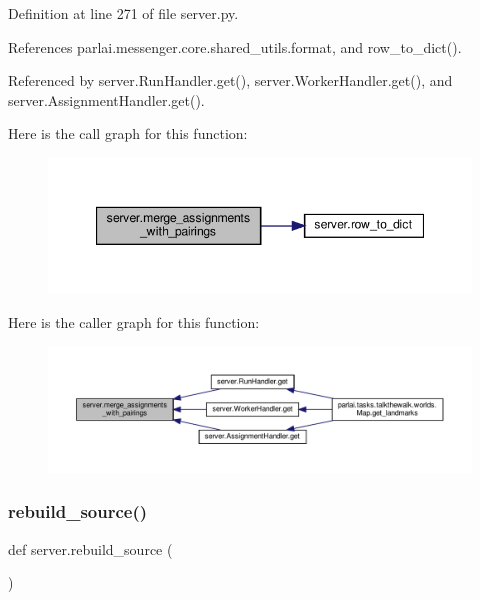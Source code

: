Definition at line 271 of file server.\+py.



References parlai.\+messenger.\+core.\+shared\+\_\+utils.\+format, and row\+\_\+to\+\_\+dict().



Referenced by server.\+Run\+Handler.\+get(), server.\+Worker\+Handler.\+get(), and server.\+Assignment\+Handler.\+get().

Here is the call graph for this function\+:
\nopagebreak
\begin{figure}[H]
\begin{center}
\leavevmode
\includegraphics[width=347pt]{namespaceserver_a30d7f5eb7c84bbe9bc4c3100bd3be229_cgraph}
\end{center}
\end{figure}
Here is the caller graph for this function\+:
\nopagebreak
\begin{figure}[H]
\begin{center}
\leavevmode
\includegraphics[width=350pt]{namespaceserver_a30d7f5eb7c84bbe9bc4c3100bd3be229_icgraph}
\end{center}
\end{figure}
\mbox{\label{namespaceserver_a802e832a8f540e02174b559972488adb}} 
\subsubsection{\texorpdfstring{rebuild\+\_\+source()}{rebuild\_source()}}
{\footnotesize\ttfamily def server.\+rebuild\+\_\+source (\begin{DoxyParamCaption}{ }\end{DoxyParamCaption})}



